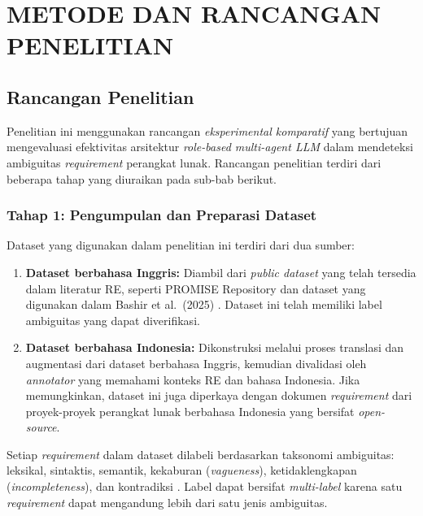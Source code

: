 
\chapter{METODE DAN RANCANGAN PENELITIAN}

\section{Rancangan Penelitian}

Penelitian ini menggunakan rancangan \textit{eksperimental komparatif} yang bertujuan mengevaluasi efektivitas arsitektur \textit{role-based multi-agent LLM} dalam mendeteksi ambiguitas \textit{requirement} perangkat lunak. Rancangan penelitian terdiri dari beberapa tahap yang diuraikan pada sub-bab berikut.

\subsection{Tahap 1: Pengumpulan dan Preparasi Dataset}

Dataset yang digunakan dalam penelitian ini terdiri dari dua sumber:
\begin{enumerate}
	\item \textbf{Dataset berbahasa Inggris:} Diambil dari \textit{public dataset} yang telah tersedia dalam literatur RE, seperti PROMISE Repository dan dataset yang digunakan dalam Bashir et al.\ (2025) \cite{bashir2025}. Dataset ini telah memiliki label ambiguitas yang dapat diverifikasi.
	\item \textbf{Dataset berbahasa Indonesia:} Dikonstruksi melalui proses translasi dan augmentasi dari dataset berbahasa Inggris, kemudian divalidasi oleh \textit{annotator} yang memahami konteks RE dan bahasa Indonesia. Jika memungkinkan, dataset ini juga diperkaya dengan dokumen \textit{requirement} dari proyek-proyek perangkat lunak berbahasa Indonesia yang bersifat \textit{open-source}.
\end{enumerate}

Setiap \textit{requirement} dalam dataset dilabeli berdasarkan taksonomi ambiguitas: leksikal, sintaktis, semantik, kekaburan (\textit{vagueness}), ketidaklengkapan (\textit{incompleteness}), dan kontradiksi \cite{berry2004}. Label dapat bersifat \textit{multi-label} karena satu \textit{requirement} dapat mengandung lebih dari satu jenis ambiguitas.

